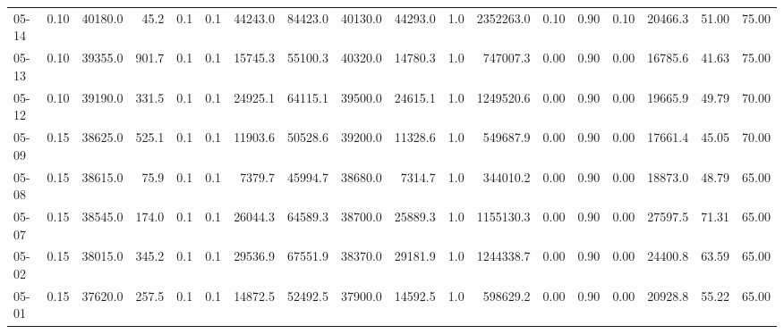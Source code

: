 \begin{threeparttable}
{\begin{tabular}{lrrrrrrrrrrrrrrrrr}
  05-14 &     0.10 & 40180.0 &              45.2 &               0.1 &                0.1 &            44243.0 & 84423.0 & 40130.0 &    44293.0 &                      1.0 &           2352263.0 &       0.10 &      0.90 &           0.10 &          20466.3 &           51.00 &                  75.00 \\
  05-13 &     0.10 & 39355.0 &             901.7 &               0.1 &                0.1 &            15745.3 & 55100.3 & 40320.0 &    14780.3 &                      1.0 &            747007.3 &       0.00 &      0.90 &           0.00 &          16785.6 &           41.63 &                  75.00 \\
  05-12 &     0.10 & 39190.0 &             331.5 &               0.1 &                0.1 &            24925.1 & 64115.1 & 39500.0 &    24615.1 &                      1.0 &           1249520.6 &       0.00 &      0.90 &           0.00 &          19665.9 &           49.79 &                  70.00 \\
  05-09 &     0.15 & 38625.0 &             525.1 &               0.1 &                0.1 &            11903.6 & 50528.6 & 39200.0 &    11328.6 &                      1.0 &            549687.9 &       0.00 &      0.90 &           0.00 &          17661.4 &           45.05 &                  70.00 \\
  05-08 &     0.15 & 38615.0 &              75.9 &               0.1 &                0.1 &             7379.7 & 45994.7 & 38680.0 &     7314.7 &                      1.0 &            344010.2 &       0.00 &      0.90 &           0.00 &          18873.0 &           48.79 &                  65.00 \\
  05-07 &     0.15 & 38545.0 &             174.0 &               0.1 &                0.1 &            26044.3 & 64589.3 & 38700.0 &    25889.3 &                      1.0 &           1155130.3 &       0.00 &      0.90 &           0.00 &          27597.5 &           71.31 &                  65.00 \\
  05-02 &     0.15 & 38015.0 &             345.2 &               0.1 &                0.1 &            29536.9 & 67551.9 & 38370.0 &    29181.9 &                      1.0 &           1244338.7 &       0.00 &      0.90 &           0.00 &          24400.8 &           63.59 &                  65.00 \\
  05-01 &     0.15 & 37620.0 &             257.5 &               0.1 &                0.1 &            14872.5 & 52492.5 & 37900.0 &    14592.5 &                      1.0 &            598629.2 &       0.00 &      0.90 &           0.00 &          20928.8 &           55.22 &                  65.00 \\

\end{tabular}}
\end{threeparttable}
